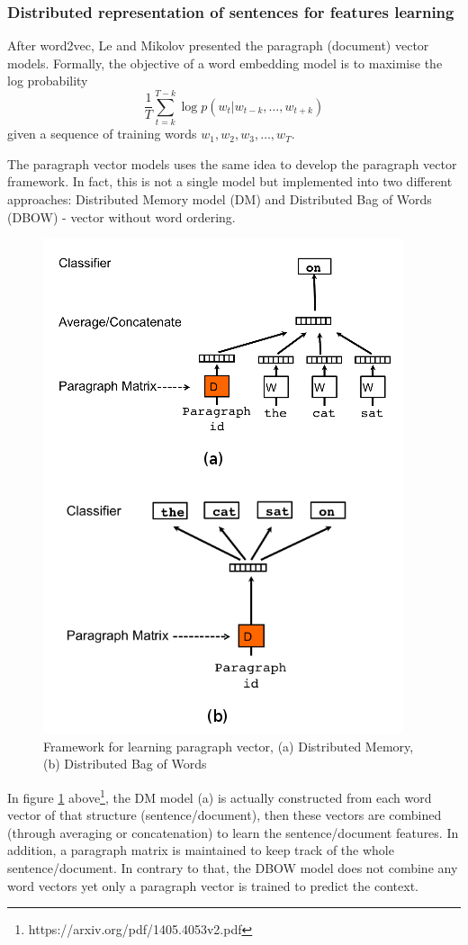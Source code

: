 \documentclass[conference,compsoc]{IEEEtran}
\begin{document}
\subsubsection{Distributed representation of sentences for features learning}
After word2vec\cite{mikolov2013distributed}, Le and Mikolov presented the paragraph (document) vector models. Formally, the objective of a word embedding model  is to maximise the log probability
\[\frac{1}{T}\sum_{t=k}^{T-k}\log p(w_t|w_{t-k},\dots,w_{t+k}) \]
given a sequence of training words $w_1,w_2,w_3,\dots,w_T$.

The paragraph vector models uses the same idea to develop the paragraph vector framework. In fact, this is not a single model but implemented into two different approaches: Distributed Memory model (DM) and Distributed Bag of Words (DBOW) - vector without word ordering.

\begin{figure}[h]
	\centering
	\includegraphics[scale=0.5]{doc2vec}
	\caption{Framework for learning paragraph vector, (a) Distributed Memory, (b) Distributed Bag of Words}
	\label{fig:doc2vec}
\end{figure}

In figure \ref{fig:doc2vec} above\footnote{https://arxiv.org/pdf/1405.4053v2.pdf}, the DM model (a) is actually constructed from each word vector of that structure (sentence/document), then these vectors are combined (through averaging or concatenation) to learn the sentence/document features. In addition, a paragraph matrix is maintained to keep track of the whole sentence/document. In contrary to that, the DBOW model does not combine any word vectors yet only a paragraph vector is trained to predict the context.
\end{document}
